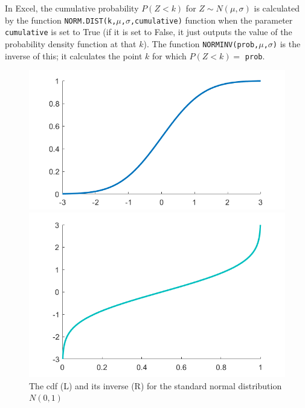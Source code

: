 In Excel, the cumulative probability $P(Z < k)$ for $Z \sim N(\mu,\sigma)$ is calculated by the function \texttt{NORM.DIST(k,$\mu$,$\sigma$,cumulative)} function when the parameter \texttt{cumulative} is set to True (if it is set to False, it just outputs the value of the probability density function at that $k$). 
The function \texttt{NORMINV(prob,$\mu$,$\sigma$)} is the inverse of this; it calculates the point $k$ for which $P(Z < k) = $ \texttt{prob}.

\begin{figure}[htbp]
 \begin{minipage}{.5\textwidth}
        \centering
	\includegraphics[width=0.9\linewidth]{fig/2_normal_cdf}
    \end{minipage}
    \begin{minipage}{0.5\textwidth}
        \centering
	\includegraphics[width=0.9\linewidth]{fig/2_normal_cdf_inv}
    \end{minipage}	
    \caption{The cdf (L) and its inverse (R) for the standard normal distribution $N(0,1)$\label{fig:2_normal_cdf}}
\end{figure}

